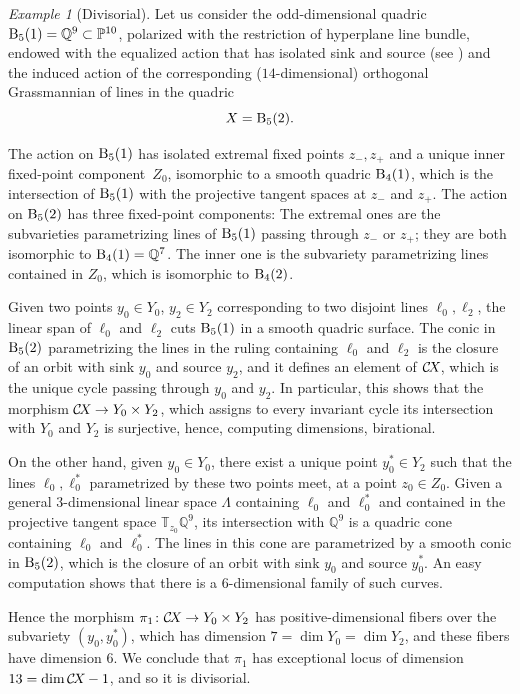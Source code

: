 \documentclass[10pt,a4paper]{article}
\numberwithin{equation}{section}
\theoremstyle{definition}
\theoremstyle{remark}
\newtheorem{example}[theorem]{Example}
\newcommand\PP{{\mathbb{P}}}
\def\DB{{\rm B}}
\def\CX{\mathcal{C}\!X\hspace{-0.5pt}}
\begin{document}
\begin{example}[Divisorial]\label{ex:div}
  Let us consider the odd-dimensional quadric $\DB_{5}(1)=\mathbb Q^{9} \subset \PP^{10}$, polarized with the restriction of hyperplane line bundle, endowed with the equalized action that has isolated sink and source (see \cite[Section~3.2]{FS}) and the induced action of the corresponding ($14$-dimensional) orthogonal Grassmannian of lines in the quadric
\[X=\DB_5(2).\]

The action on $\DB_{5}(1)$ has isolated extremal fixed points $z_-,z_+$ and a unique inner fixed-point component~$Z_0$, isomorphic to a smooth quadric $\DB_{4}(1)$, which is the intersection of $\DB_5(1)$ with the projective tangent spaces at $z_-$ and $z_+$. The action on $\DB_{5}(2)$ has three fixed-point components: The extremal ones are the subvarieties parametrizing lines of $\DB_5(1)$ passing through $z_-$ or $z_+$; they are both isomorphic to $\DB_{4}(1)=\mathbb Q^{7}$. The inner one is the subvariety parametrizing lines contained in $Z_0$, which is isomorphic to $\DB_{4}(2)$.

Given two points $y_0 \in Y_0$, $y_2 \in Y_2$ corresponding to two disjoint lines $\ell_0,\ell_2$, the linear span of $\ell_0$ and $\ell_2$ cuts $\DB_{5}(1)$ in a smooth quadric surface. The conic in $\DB_5(2)$ parametrizing the lines in the ruling containing $\ell_0$ and $\ell_2$ is the closure of an orbit with sink $y_0$ and source $y_2$, and it defines an element of $\CX$, which is the unique cycle passing through $y_0$ and $y_2$. In particular, this shows that the morphism $\CX \to Y_0 \times Y_2$, which assigns to every invariant cycle its intersection with $Y_0$ and $Y_2$ is surjective, hence, computing dimensions, birational.

On the other hand, given $y_0 \in Y_0$, there exist a unique point $y_0^*\in Y_2$ such that the lines $\ell_0,\ell_0^*$ parametrized by these two points meet, at a point $z_0 \in Z_0$. Given a general $3$-dimensional linear space $\Lambda$ containing $\ell_0$ and $\ell_0^*$ and contained in the projective tangent space $\mathbb T_{z_0}\mathbb Q^{9}$, its intersection with $\mathbb Q^{9}$ is a quadric cone containing $\ell_0$ and $\ell_0^*$. The lines in this cone are parametrized by a smooth conic in $\DB_{5}(2)$, which is the closure of an orbit with sink $y_0$ and source $y_0^*$. An easy computation shows that there is a $6$-dimensional family of such curves.

Hence the morphism $\pi_1\colon \CX \to Y_0 \times Y_2$ has positive-dimensional fibers over the subvariety $(y_0,y_0^*)$, which has dimension $7 = \dim Y_0=\dim Y_2$, and these fibers have  dimension $6$. We conclude that $\pi_1$ has exceptional locus of dimension $13= \dim \CX -1$, and so it is divisorial. 
\end{example}
\end{document}
